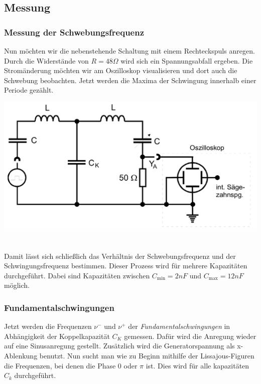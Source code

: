 \subsection{Messung}
\subsubsection*{Messung der Schwebungsfrequenz}
\begin{minipage}{0.3\textwidth}
    Nun möchten wir die nebenstehende Schaltung mit einem Rechteckspuls anregen.
    Durch die Widerstände von $R = 48 \Omega$ wird sich ein Spannungsabfall ergeben.
    Die Stromänderung möchten wir am Oszilloskop visualisieren und dort auch die Schwebung beobachten.
    Jetzt werden die Maxima der Schwingung innerhalb einer Periode gezählt.
\end{minipage}
\begin{minipage}{0.7\textwidth}
    \includegraphics[width=\textwidth]{pictures/schwebeschaltung.png}
\end{minipage}
\\

Damit lässt sich schließlich das Verhältnis der Schwebungsfrequenz und der Schwingungsfrequenz bestimmen.
Dieser Prozess wird für mehrere Kapazitäten durchgeführt.
Dabei sind Kapazitäten zwischen $C_{\text{min}} = 2 nF$ und $C_{\text{max}} = 12 nF$ möglich.

\subsubsection*{Fundamentalschwingungen}
Jetzt werden die Frequenzen $\nu^{-}$ und $\nu^{+}$ der \textit{Fundamentalschwingungen} in 
Abhängigkeit der Koppelkapazität $C_{K}$ gemessen.
Dafür wird die Anregung wieder auf eine Sinusanregung gestellt.
Zusätzlich wird die Generatorspannung als x-Ablenkung benutzt.
Nun sucht man wie zu Beginn mithilfe der Lissajous-Figuren die Frequenzen, bei denen die Phase 0 oder $\pi$ ist.
Dies wird für alle kapazitäten $C_{k}$ durchgeführt.

